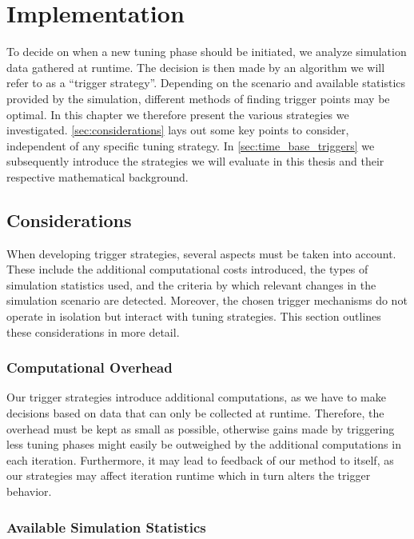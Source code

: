 \chapter[Implementation]{Implementation}
\label{cp:implementation}

{
	\parindent0pt
	To decide on when a new tuning phase should be initiated, we analyze simulation data gathered at runtime. The decision is then made by an algorithm we will refer to as a \enquote{trigger strategy}. Depending on the scenario and available statistics provided by the simulation, different methods of finding trigger points may be optimal. In this chapter we therefore present the various strategies we investigated. \autoref{sec:considerations} lays out some key points to consider, independent of any specific tuning strategy. In \autoref{sec:time_base_triggers} we subsequently introduce the strategies we will evaluate in this thesis and their respective mathematical background.
}

\section{Considerations}
\label{sec:considerations}
When developing trigger strategies, several aspects must be taken into account. These include the additional computational costs introduced, the types of simulation statistics used, and the criteria by which relevant changes in the simulation scenario are detected. Moreover, the chosen trigger mechanisms do not operate in isolation but interact with tuning strategies. This section outlines these considerations in more detail.

\subsection{Computational Overhead}
Our trigger strategies introduce additional computations, as we have to make decisions based on data that can only be collected at runtime. Therefore, the overhead must be kept as small as possible, otherwise gains made by triggering less tuning phases might easily be outweighed by the additional computations in each iteration. Furthermore, it may lead to feedback of our method to itself, as our strategies may affect iteration runtime which in turn alters the trigger behavior.

\subsection{Available Simulation Statistics}
\label{sec:avail_sim_stats}

